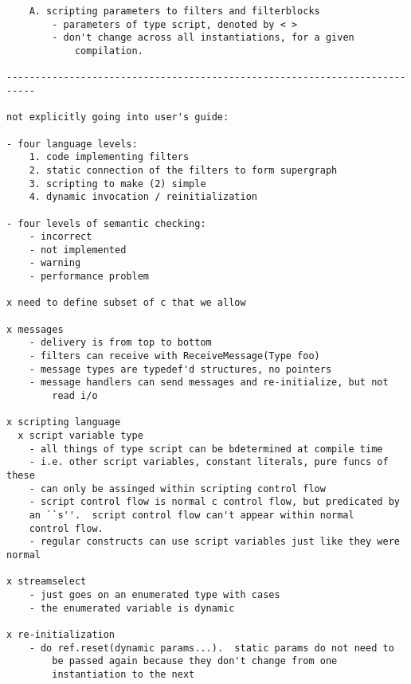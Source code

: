\documentclass[draft]{article}
\begin{document}
\begin{verbatim}
	A. scripting parameters to filters and filterblocks
		- parameters of type script, denoted by < >
		- don't change across all instantiations, for a given 
			compilation.

---------------------------------------------------------------------------

not explicitly going into user's guide:

- four language levels:
	1. code implementing filters
	2. static connection of the filters to form supergraph
	3. scripting to make (2) simple
	4. dynamic invocation / reinitialization

- four levels of semantic checking:
	- incorrect
	- not implemented
	- warning
	- performance problem

x need to define subset of c that we allow

x messages
	- delivery is from top to bottom
	- filters can receive with ReceiveMessage(Type foo)
	- message types are typedef'd structures, no pointers
	- message handlers can send messages and re-initialize, but not
		read i/o

x scripting language
  x script variable type
    - all things of type script can be bdetermined at compile time
    - i.e. other script variables, constant literals, pure funcs of these
    - can only be assinged within scripting control flow
    - script control flow is normal c control flow, but predicated by
	an ``s''.  script control flow can't appear within normal 
	control flow.
    - regular constructs can use script variables just like they were normal

x streamselect
	- just goes on an enumerated type with cases
	- the enumerated variable is dynamic

x re-initialization
	- do ref.reset(dynamic params...).  static params do not need to
		be passed again because they don't change from one 
		instantiation to the next

\end{verbatim}
\end{document}
